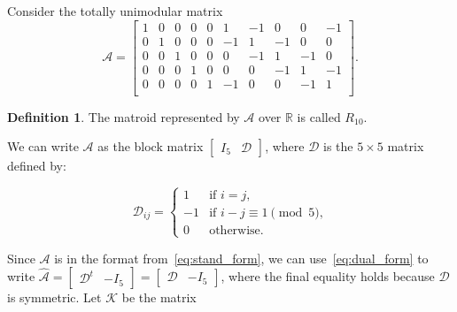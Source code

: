 \documentclass[12p]{amsart}
\numberwithin{equation}{section}
\theoremstyle{plain}
\theoremstyle{definition}
\newtheorem{defn}[thm]{Definition}
\begin{document}
Consider the totally unimodular matrix
\begin{equation}\label{eq:R10}\mathcal A = \begin{bmatrix}
    1 & 0 & 0 & 0 & 0 &   1 & -1 & 0 & 0 & -1\\
    0 & 1 & 0 & 0 & 0 &   -1 & 1 &-1 & 0 & 0\\
    0 & 0 & 1 & 0 & 0 &   0 & -1 & 1 & -1 & 0\\
    0 & 0 & 0 & 1 & 0 &   0 & 0 & -1 & 1 & -1\\
    0 & 0 & 0 & 0 & 1 &   -1 & 0 & 0 & -1 & 1\\
\end{bmatrix}.\end{equation}

\begin{defn}\label{def:R10}
    The matroid represented by $\mathcal A$ over $\mathbb R$ is called $R_{10}$. 
\end{defn}

We can write $\mathcal A$ as the block matrix $\begin{bmatrix} I_5 & \mathcal D \end{bmatrix}$, where $\mathcal D$ is the $5 \times 5$ matrix defined by:

\[\mathcal D_{ij} = \begin{cases} 1 & \text{if $i=j$,}\\
-1 &\text{if $i-j \equiv 1\pmod 5$,}\\
0 & \text{otherwise.}\end{cases}\]

Since $\mathcal A$ is in the format from~\eqref{eq:stand_form}, we can use~\eqref{eq:dual_form} to write $\widehat{\mathcal A} = \begin{bmatrix}\mathcal D^t & -I_5 \end{bmatrix} = \begin{bmatrix} \mathcal D & -I_5 \end{bmatrix}$, where the final equality holds because $\mathcal D$ is symmetric. Let $\mathcal K$ be the matrix 
\end{document}
